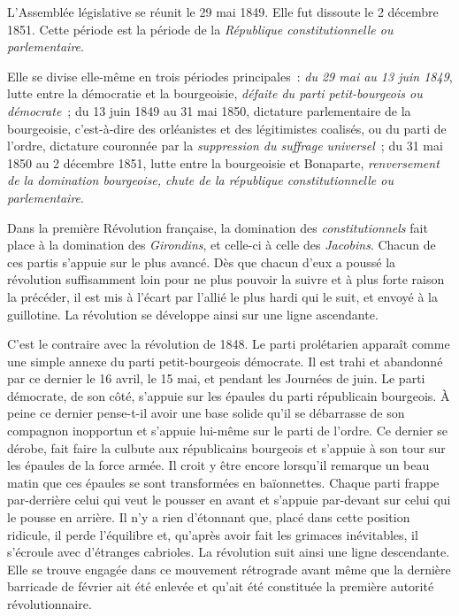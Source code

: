 \documentclass[french,twoside]{book} %
\newcommand\chaptercont{} %
\begin{document}
\chaptercont
\noindent L’Assemblée législative se réunit le 29 mai 1849. Elle fut dissoute le 2 décembre 1851. Cette période est la période de la \emph{République constitutionnelle ou parlementaire}.\par
Elle se divise elle-même en trois périodes principales : \emph{du 29 mai au 13 juin 1849}, lutte entre la démocratie et la bourgeoisie, \emph{défaite du parti petit-bourgeois ou démocrate} ; du 13 juin 1849 au 31 mai 1850, dictature parlementaire de la bourgeoisie, c’est-à-dire des orléanistes et des légitimistes coalisés, ou du parti de l’ordre, dictature couronnée par la \emph{suppression du suffrage universel} ; du 31 mai 1850 au 2 décembre 1851, lutte entre la bourgeoisie et Bonaparte, \emph{renversement de la domination bourgeoise, chute de la république constitutionnelle ou parlementaire}.\par
Dans la première Révolution française, la domination des \emph{constitutionnels} fait place à la domination des \emph{Girondins}, et celle-ci à celle des \emph{Jacobins}. Chacun de ces partis s’appuie sur le plus avancé. Dès que chacun d’eux a poussé la révolution suffisamment loin pour ne plus pouvoir la suivre et à plus forte raison la précéder, il est mis à l’écart par l’allié le plus hardi qui le suit, et envoyé à la guillotine. La révolution se développe ainsi sur une ligne ascendante.\par
C’est le contraire avec la révolution de 1848. Le parti prolétarien apparaît comme une simple annexe du parti petit-bourgeois démocrate. Il est trahi et abandonné par ce dernier le 16 avril, le 15 mai, et pendant les Journées de juin. Le parti démocrate, de son côté, s’appuie sur les épaules du parti républicain bourgeois. À peine ce dernier pense-t-il avoir une base solide qu’il se débarrasse de son compagnon inopportun et s’appuie lui-même sur le parti de l’ordre. Ce dernier se dérobe, fait faire la culbute aux républicains bourgeois et s’appuie à son tour sur les épaules de la force armée. Il croit y être encore lorsqu’il remarque un beau matin que ces épaules se sont transformées en baïonnettes. Chaque parti frappe par-derrière celui qui veut le pousser en avant et s’appuie par-devant sur celui qui le pousse en arrière. Il n’y a rien d’étonnant que, placé dans cette position ridicule, il perde l’équilibre et, qu’après avoir fait les grimaces inévitables, il s’écroule avec d’étranges cabrioles. La révolution suit ainsi une ligne descendante. Elle se trouve engagée dans ce mouvement rétrograde avant même que la dernière barricade de février ait été enlevée et qu’ait été constituée la première autorité révolutionnaire.\par
\end{document}
